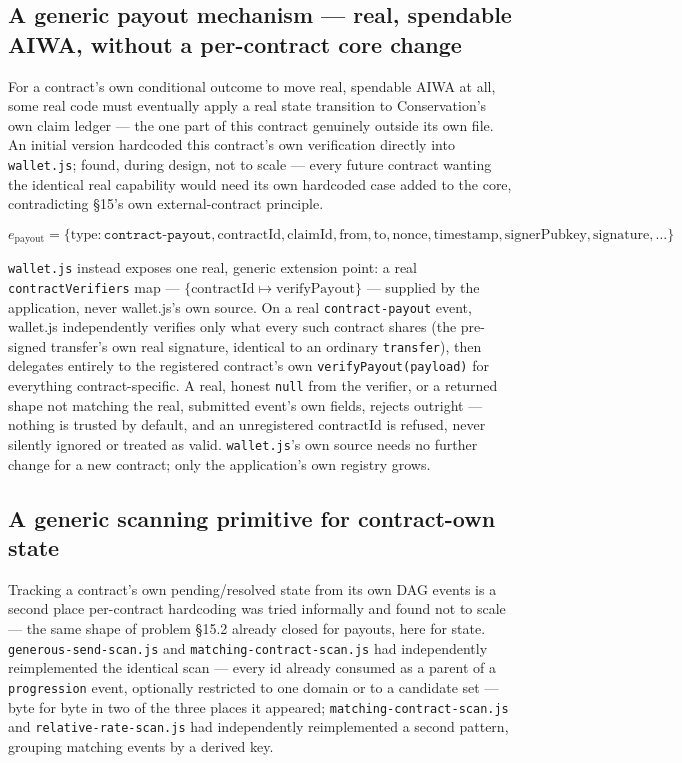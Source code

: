\documentclass[10pt]{article}
\newcommand{\code}[1]{\texttt{\small #1}}
\begin{document}
\subsection{A generic payout mechanism --- real, spendable AIWA, without a per-contract core change}

For a contract's own conditional outcome to move real, spendable AIWA at all, some real code must eventually apply a real state transition to Conservation's own claim ledger --- the one part of this contract genuinely outside its own file. An initial version hardcoded this contract's own verification directly into \code{wallet.js}; found, during design, not to scale --- every future contract wanting the identical real capability would need its own hardcoded case added to the core, contradicting \S15's own external-contract principle.

\[
e_{\mathrm{payout}} = \{\mathrm{type}: \texttt{contract-payout}, \mathrm{contractId}, \mathrm{claimId}, \mathrm{from}, \mathrm{to}, \mathrm{nonce}, \mathrm{timestamp}, \mathrm{signerPubkey}, \mathrm{signature}, \ldots\}
\]

\code{wallet.js} instead exposes one real, generic extension point: a real \code{contractVerifiers} map --- $\{\mathrm{contractId} \mapsto \mathrm{verifyPayout}\}$ --- supplied by the application, never wallet.js's own source. On a real \code{contract-payout} event, wallet.js independently verifies only what every such contract shares (the pre-signed transfer's own real signature, identical to an ordinary \code{transfer}), then delegates entirely to the registered contract's own \code{verifyPayout(payload)} for everything contract-specific. A real, honest \code{null} from the verifier, or a returned shape not matching the real, submitted event's own fields, rejects outright --- nothing is trusted by default, and an unregistered $\mathrm{contractId}$ is refused, never silently ignored or treated as valid. \code{wallet.js}'s own source needs no further change for a new contract; only the application's own registry grows.

\subsection{A generic scanning primitive for contract-own state}

Tracking a contract's own pending/resolved state from its own DAG events is a second place per-contract hardcoding was tried informally and found not to scale --- the same shape of problem \S15.2 already closed for payouts, here for state. \code{generous-send-scan.js} and \code{matching-contract-scan.js} had independently reimplemented the identical scan --- every id already consumed as a parent of a \code{progression} event, optionally restricted to one domain or to a candidate set --- byte for byte in two of the three places it appeared; \code{matching-contract-scan.js} and \code{relative-rate-scan.js} had independently reimplemented a second pattern, grouping matching events by a derived key.
\end{document}
